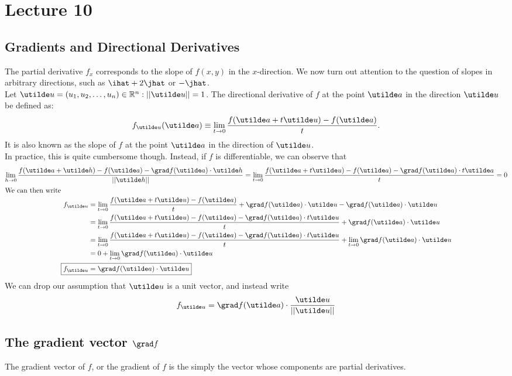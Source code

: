 \documentclass{report}
\begin{document}
\section{Lecture 10}
\subsection*{Gradients and Directional Derivatives}
The partial derivative $f_x$ corresponds to the slope of $f(x,y)$ in the $x$-direction. We now turn out attention to the question of slopes in arbitrary directions, such as $\ihat + 2\jhat$ or $-\jhat$. \\

Let $\ut{u}=\bracks{u_1,u_2,\dots,u_n} \in\bbr^n:||\ut{u}||=1$. The directional derivative of $f$ at the point $\ut{a}$ in the direction $\ut{u}$ be defined as:
$$
	f_{\ut{u}}(\ut{a})\equiv \lim_{t\to0} \frac{f(\ut{a} + t\ut{u}) - f(\ut{a})}{t}.
$$
It is also known as the slope of $f$ at the point $\ut{a}$ in the direction of $\ut{u}$. \\

In practice, this is quite cumbersome though. Instead, if $f$ is differentiable, we can observe that
\begin{gather*}
	\lim_{h\to0}\frac{f(\ut{a}+\ut{h}) - f(\ut{a}) - \grad f(\ut{a})\cd\ut{h}}{||\ut{h}||} = \lim_{t\to0}\frac{f(\ut{a}+t\ut{u}) - f(\ut{a}) - \grad f(\ut{a})\cd t\ut{a}}{t} = 0 \\
	\intertext{We can then write}
	\begin{align*}
		f_{\ut{u}} &= \lim_{t\to0}\frac{f(\ut{a}+t\ut{u}) - f(\ut{a})}{t} + \grad f(\ut{a})\cd \ut{u} - \grad f(\ut{a})\cd \ut{u} \\
			&= \lim_{t\to0}\frac{f(\ut{a}+t\ut{u}) - f(\ut{a}) - \grad f(\ut{a})\cd t\ut{u}}{t} + \grad f(\ut{a})\cd \ut{u}  \\
			&= \lim_{t\to0}\frac{f(\ut{a}+t\ut{u}) - f(\ut{a}) - \grad f(\ut{a})\cd t\ut{u}}{t} + \lim_{t\to0} \grad f(\ut{a})\cd \ut{u}  \\
			&= 0 + \lim_{t\to0} \grad f(\ut{a})\cd \ut{u} \\
			\Aboxed{f_{\ut{u}} &= \grad f(\ut{a})\cd \ut{u}}  
	\end{align*}
\end{gather*}
We can drop our assumption that $\ut{u}$ is a unit vector, and instead write 
$$
	f_{\ut{u}} = \grad f(\ut{a}) \cd \frac{\ut{u}}{||\ut{u}||}
$$

\subsection*{The gradient vector $\grad f$}
The gradient vector of $f$, or the gradient of $f$ is the simply the vector whose components are partial derivatives. \\
\end{document}
